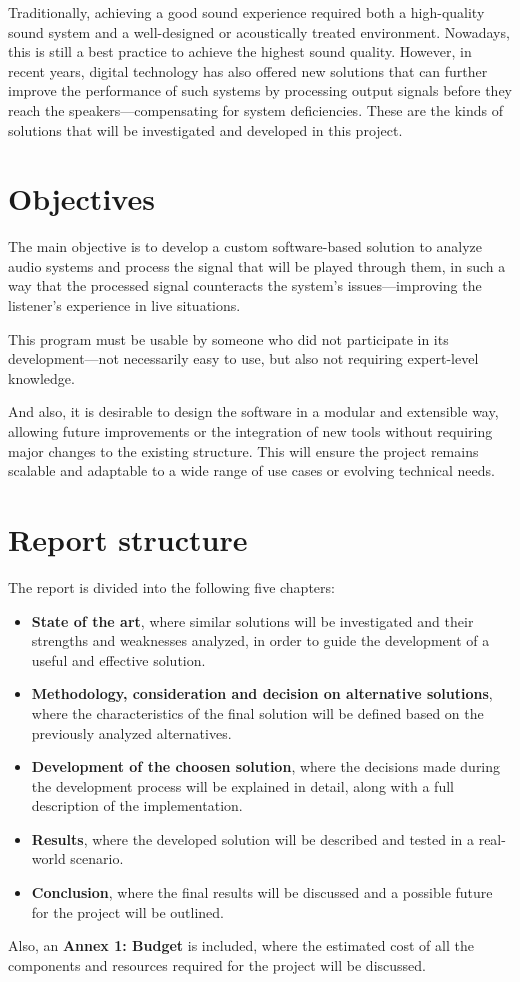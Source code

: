Traditionally, achieving a good sound experience required both a high-quality sound system and a well-designed or acoustically treated environment. Nowadays, this is still a best practice to achieve the highest sound quality. However, in recent years, digital technology has also offered new solutions that can further improve the performance of such systems by processing output signals before they reach the speakers—compensating for system deficiencies. These are the kinds of solutions that will be investigated and developed in this project.


\section{Objectives}

The main objective is to develop a custom software-based solution to analyze audio systems and process the signal that will be played through them, in such a way that the processed signal counteracts the system’s issues—improving the listener’s experience in live situations.

This program must be usable by someone who did not participate in its development—not necessarily easy to use, but also not requiring expert-level knowledge.

And also, it is desirable to design the software in a modular and extensible way, allowing future improvements or the integration of new tools without requiring major changes to the existing structure. This will ensure the project remains scalable and adaptable to a wide range of use cases or evolving technical needs.

\section{Report structure}

The report is divided into the following five chapters:

\begin{itemize}
	\item \textbf{State of the art}, where similar solutions will be investigated and their strengths and weaknesses analyzed, in order to guide the development of a useful and effective solution.
	
	\item \textbf{Methodology, consideration and decision on alternative solutions}, where the characteristics of the final solution will be defined based on the previously analyzed alternatives.
	
	\item \textbf{Development of the choosen solution}, where the decisions made during the development process will be explained in detail, along with a full description of the implementation.
	
	\item \textbf{Results}, where the developed solution will be described and tested in a real-world scenario.
	
	\item \textbf{Conclusion}, where the final results will be discussed and a possible future for the project will be outlined.
\end{itemize}

Also, an \textbf{Annex 1: Budget} is included, where the estimated cost of all the components and resources required for the project will be discussed.


